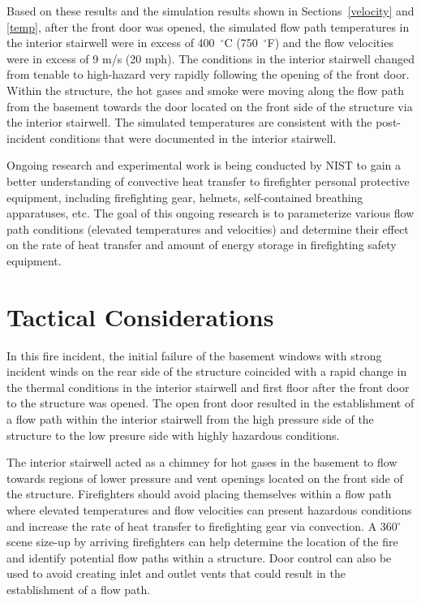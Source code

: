 \documentclass[12pt,oneside]{book}
\begin{document}
Based on these results and the simulation results shown in Sections~\ref{velocity} and \ref{temp}, after the front door was opened, the simulated flow path temperatures in the interior stairwell were in excess of 400~$^{\circ}$C (750~$^{\circ}$F) and the flow velocities were in excess of 9 m/s (20 mph). The conditions in the interior stairwell changed from tenable to high-hazard very rapidly following the opening of the front door. Within the structure, the hot gases and smoke were moving along the flow path from the basement towards the door located on the front side of the structure via the interior stairwell. The simulated temperatures are consistent with the post-incident conditions that were documented in the interior stairwell.

Ongoing research and experimental work is being conducted by NIST to gain a better understanding of convective heat transfer to firefighter personal protective equipment, including firefighting gear, helmets, self-contained breathing apparatuses, etc. The goal of this ongoing research is to parameterize various flow path conditions (elevated temperatures and velocities) and determine their effect on the rate of heat transfer and amount of energy storage in firefighting safety equipment.

\clearpage

\section{Tactical Considerations}
\label{tactical_considerations}

In this fire incident, the initial failure of the basement windows with strong incident winds on the rear side of the structure coincided with a rapid change in the thermal conditions in the interior stairwell and first floor after the front door to the structure was opened. The open front door resulted in the establishment of a flow path within the interior stairwell from the high pressure side of the structure to the low presure side with highly hazardous conditions.

The interior stairwell acted as a chimney for hot gases in the basement to flow towards regions of lower pressure and vent openings located on the front side of the structure. Firefighters should avoid placing themselves within a flow path where elevated temperatures and flow velocities can present hazardous conditions and increase the rate of heat transfer to firefighting gear via convection. A 360$^\circ$ scene size-up by arriving firefighters can help determine the location of the fire and identify potential flow paths within a structure. Door control can also be used to avoid creating inlet and outlet vents that could result in the establishment of a flow path.
\end{document}
